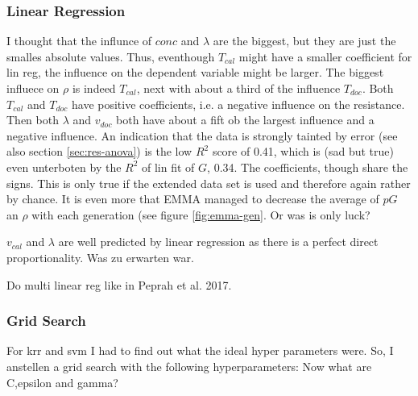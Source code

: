 
\subsubsection{Linear Regression}
I thought that the influnce of $conc$ and $\lambda$ are the biggest, but they are just the smalles absolute values. 
Thus, eventhough $T_{cal}$ might have a smaller coefficient for lin reg, the influence on the dependent variable might be larger. 
The biggest influece on $\rho$ is indeed $T_{cal}$, next with about a third of the influence $T_{doc}$. 
Both $T_{cal}$ and $T_{doc}$ have positive coefficients, i.e. a negative influence on the resistance. 
Then both $\lambda$ and $v_{doc}$ both have about a fift ob the largest influence and a negative influence. 
An indication that the data is strongly tainted by error (see also section \ref{sec:res-anova}) is the low $R^2$ score of 0.41, 
which is (sad but true) even unterboten by the $R^2$ of lin fit of $G$, 0.34. 
The coefficients, though share the signs. 
This is only true if the extended data set is used and therefore again rather by chance. 
It is even more  that EMMA managed to decrease the average of $pG$ an $\rho$ with each generation (see figure \ref{fig:emma-gen}. 
Or was is only luck? 

$v_{cal}$ and $\lambda$ are well predicted by linear regression as there is a perfect direct proportionality. 
Was zu erwarten war. 


Do multi linear reg like in Peprah et al. 2017\cite{peprah2017appraisal}.


\subsubsection{Grid Search}
For \gls{krr} and {svm} I had to find out what the ideal hyper parameters were. 
So, I anstellen a grid search with the following hyperparameters: 
Now what are C,epsilon and gamma? 

